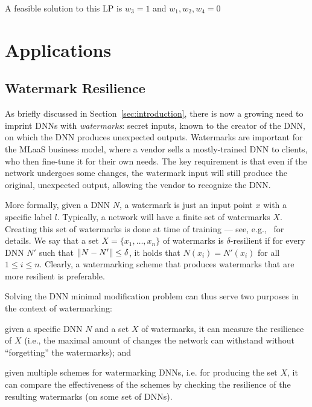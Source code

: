 \documentclass{easychair}
\begin{document}
A feasible solution to this LP is $w_3=1$ and $w_1,w_2,w_4=0$


\section{Applications}
\label{sec:applications}

\subsection{Watermark Resilience}
As briefly discussed in Section~\ref{sec:introduction}, there is now a
growing need to imprint DNNs with \emph{watermarks}: secret inputs,
known to the creator of the DNN, on which the DNN produces unexpected
outputs. Watermarks are important for the MLaaS business model, where
a vendor sells a mostly-trained DNN to clients, who then fine-tune
it for their own needs. The key requirement is that even if the
network undergoes some changes, the watermark input will still produce
the original, unexpected output, allowing the vendor to recognize the
DNN.

More formally, given a DNN $N$, a watermark is just an input point $x$
with a specific label $l$. Typically, a network will have a finite set of
watermarks $X$. Creating this set of watermarks is done at time of
training --- see, e.g.,~\cite{AdBaPiKeWatermarking} for details. We
say that a set $X=\{x_1,\ldots,x_n\}$ of watermarks is $\delta$-resilient if for every
DNN $N'$ such that $\left\lVert N-N'\right\rVert\leq \delta$, it holds that
$N(x_i)=N'(x_i)$ for all $1\leq i \leq n$. Clearly, a watermarking
scheme that produces watermarks that are more resilient is preferable.

Solving the DNN minimal modification problem can thus serve two
purposes in the context of watermarking:
\begin{inparaenum}[(i)]
  \item given a specific DNN $N$ and a set $X$ of watermarks, it can
    measure the resilience of $X$ (i.e., the maximal amount of changes
    the network can withstand without ``forgetting'' the watermarks);
    and
  \item given multiple schemes for watermarking DNNs, i.e. for
    producing the set $X$, it can compare the effectiveness of the
    schemes by checking the resilience of the resulting watermarks
    (on some set of DNNs).
\end{inparaenum}
  
\end{document}
